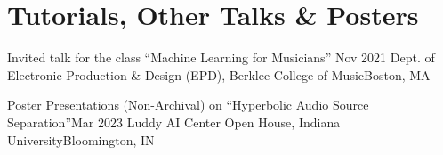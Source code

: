 \section{Tutorials, Other Talks \& Posters}
\resumeSubHeadingListStart

    \resumeSubheading
    {Invited talk for the class ``Machine Learning for Musicians'' }{Nov 2021}
    {Dept. of Electronic Production \& Design (EPD), Berklee College of Music}{Boston, MA}

    \resumeSubheading
    {Poster Presentations (Non-Archival) on ``Hyperbolic Audio Source Separation''}{Mar 2023}
    {Luddy AI Center Open House, Indiana University}{Bloomington, IN}

\resumeSubHeadingListEnd